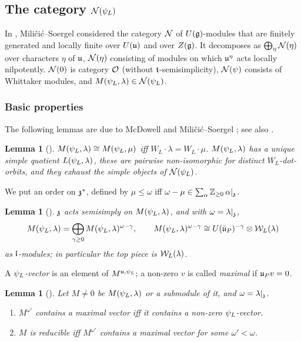 \documentclass{article}
\theoremstyle{plain}
\newtheorem{lemma}[theorem]{Lemma}
\theoremstyle{definition}
\theoremstyle{remark}
\numberwithin{equation}{section}
\begin{document}
\subsection{The category \texorpdfstring{$\mathcal{N}(\psi_L)$}{N(psi\_L)}}\label{sec:N}
In \cite{Milicic1997}, Mili\v{c}i\'c--Soergel considered the category $\mathcal{N}$ of $U(\mathfrak{g})$-modules that are finitely generated and locally finite over $U(\mathfrak{u})$ and over $Z(\mathfrak{g})$. It decomposes as $\bigoplus_\eta\mathcal{N}(\eta)$ over characters $\eta$ of $\mathfrak{u}$, $\mathcal{N}(\eta)$ consisting of modules on which $\mathfrak{u}^\eta$ acts locally nilpotently. $\mathcal{N}(0)$ is category $\mathcal{O}$ (without $\mathfrak{t}$-semisimplicity), $\mathcal{N}(\psi)$ consists of Whittaker modules, and $M(\psi_L,\lambda)\in\mathcal{N}(\psi_L)$.

\subsubsection{Basic properties}\label{sec:N-properties}
The following lemmas are due to McDowell \cite{MCDOWELL1985161} and Mili\v{c}i\'c--Soergel \cite{Milicic1997}; see also \cite[\S2.2]{eberhardt2024proofsjantzenconjecturewhittaker}.

\begin{lemma}[{\cite[Proposition 2.1]{Milicic1997}}]\label{lem:MS}
$M(\psi_L,\lambda)\cong M(\psi_L,\mu)$ iff $W_L\cdot\lambda=W_L\cdot\mu$. $M(\psi_L,\lambda)$ has a unique simple quotient $L(\psi_L,\lambda)$, these are pairwise non-isomorphic for distinct $W_L$-dot-orbits, and they exhaust the simple objects of $\mathcal{N}(\psi_L)$.
\end{lemma}

We put an order on $\mathfrak{z}^*$, defined by $\mu\leq\omega$ iff $\omega-\mu\in\sum_\alpha\mathbb{Z}_{\geq0}\,\alpha|_{\mathfrak{z}}$.

\begin{lemma}[{\cite[Proposition 2.4]
{MCDOWELL1985161}}]\label{lem:McD-weights}
$\mathfrak{z}$ acts semisimply on $M(\psi_L,\lambda)$, and with $\omega=\lambda|_{\mathfrak{z}}$,
\[
M(\psi_L,\lambda)=\bigoplus_{\gamma\geq0}M(\psi_L,\lambda)^{\omega-\gamma},\qquad M(\psi_L,\lambda)^{\omega-\gamma}\cong U(\bar{\mathfrak{u}}_P)^{-\gamma}\otimes\mathcal{W}_L(\lambda)
\]
as $\mathfrak{l}$-modules; in particular the top piece is $\mathcal{W}_L(\lambda)$.
\end{lemma}

A \emph{$\psi_L$-vector} is an element of $M^{\mathfrak{u},\psi_L}$; a non-zero $v$ is called \emph{maximal} if $\mathfrak{u}_Pv=0$.

\begin{lemma}[{\cite[Lemma 2.12]{MCDOWELL1985161}}]\label{lem:McD-max}
Let $M\neq0$ be $M(\psi_L,\lambda)$ or a submodule of it, and $\omega=\lambda|_{\mathfrak{z}}$.
\begin{enumerate}[label=(\arabic*)]
\item $M^{\omega'}$ contains a maximal vector iff it contains a non-zero $\psi_L$-vector.
\item $M$ is reducible iff $M^{\omega'}$ contains a maximal vector for some $\omega'<\omega$.
\end{enumerate}
\end{lemma}
\end{document}
